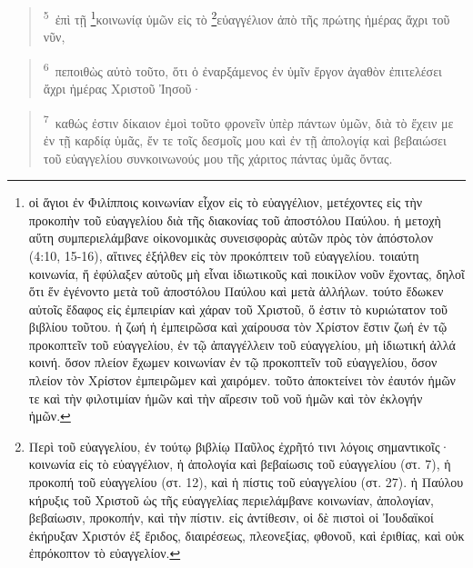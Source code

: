 \documentclass{article}
\newcommand{\currentverse}{1} %
\newcommand{\setcurrentverse}[1]{\renewcommand{\currentverse}{#1}}
\begin{document}
\begin{verse}

\setcurrentverse{5}

\setcounter{footnote}{0}

\textsuperscript{5}~ἐπὶ τῇ \footnote{
    οἱ ἅγιοι ἐν Φιλίπποις κοινωνίαν εἶχον εἰς τὸ εὐαγγέλιον, μετέχοντες εἰς τὴν προκοπὴν τοῦ εὐαγγελίου διὰ τῆς διακονίας τοῦ ἀποστόλου Παύλου. ἡ μετοχὴ αὕτη συμπεριελάμβανε οἰκονομικὰς συνεισφορὰς αὐτῶν πρὸς τὸν ἀπόστολον (4:10, 15-16), αἵτινες ἐξήλθεν εἰς τὸν προκόπτειν τοῦ εὐαγγελίου. τοιαύτη κοινωνία, ἥ ἐφύλαξεν αὐτοῦς μὴ εἶναι ἰδιωτικοῦς καὶ ποικίλον νοῦν ἔχοντας, δηλοῖ ὅτι ἕν ἐγένοντο μετὰ τοῦ ἀποστόλου Παύλου καὶ μετὰ ἀλλήλων. τούτο ἔδωκεν αὐτοῖς ἔδαφος εἰς ἐμπειρίαν καὶ χάραν τοῦ Χριστοῦ, ὅ ἐστιν τὸ κυριώτατον τοῦ βιβλίου τοῦτου. ἡ ζωή ἡ ἐμπειρῶσα καὶ χαίρουσα τὸν Χρίστον ἔστιν ζωή ἐν τῷ προκοπτεῖν τοῦ εὐαγγελίου, ἐν τῷ ἀπαγγέλλειν τοῦ εὐαγγελίου, μὴ ἰδιωτική ἀλλά κοινή. ὅσον πλείον ἔχωμεν κοινωνίαν ἐν τῷ προκοπτεῖν τοῦ εὐαγγελίου, ὅσον πλείον τὸν Χρίστον ἐμπειρῶμεν καὶ χαιρόμεν. τοῦτο ἀποκτείνει τὸν ἐαυτόν ἡμῶν τε καὶ τὴν φιλοτιμίαν ἡμῶν καὶ τὴν αἵρεσιν τοῦ νοῦ ἡμῶν καὶ τὸν ἐκλογήν ἡμῶν.
    }κοινωνίᾳ ὑμῶν εἰς τὸ \footnote{
Περὶ τοῦ εὐαγγελίου, ἐν τούτῳ βιβλίῳ Παῦλος ἐχρῆτό τινι λόγοις σημαντικοῖς· κοινωνία εἰς τὸ εὐαγγέλιον, ἡ ἀπολογία καὶ βεβαίωσις τοῦ εὐαγγελίου (στ. 7), ἡ προκοπή τοῦ εὐαγγελίου (στ. 12), καὶ ἡ πίστις τοῦ εὐαγγελίου (στ. 27). ἠ Παύλου κήρυξις τοῦ Χριστοῦ ὡς τῆς εὐαγγελίας περιελάμβανε κοινωνίαν, ἀπολογίαν, βεβαίωσιν, προκοπήν, καὶ τὴν πίστιν. εἰς ἀντίθεσιν, οἱ δὲ πιστοὶ οἱ Ἰουδαϊκοί ἐκήρυξαν Χριστόν ἐξ ἔριδος, διαιρέσεως, πλεονεξίας, φθονοῦ, καὶ ἐριθίας, καὶ οὐκ ἐπρόκοπτον τὸ εὐαγγελίον.
    }εὐαγγέλιον ἀπὸ τῆς πρώτης ἡμέρας ἄχρι τοῦ νῦν,

\end{verse}

\begin{verse}

\setcurrentverse{6}

\setcounter{footnote}{0}

\textsuperscript{6}~πεποιθὼς αὐτὸ τοῦτο, ὅτι ὁ ἐναρξάμενος ἐν ὑμῖν ἔργον ἀγαθὸν ἐπιτελέσει ἄχρι ἡμέρας Χριστοῦ Ἰησοῦ·

\end{verse}

\begin{verse}

\setcurrentverse{7}

\setcounter{footnote}{0}

\textsuperscript{7}~καθώς ἐστιν δίκαιον ἐμοὶ τοῦτο φρονεῖν ὑπὲρ πάντων ὑμῶν, διὰ τὸ ἔχειν με ἐν τῇ καρδίᾳ ὑμᾶς, ἔν τε τοῖς δεσμοῖς μου καὶ ἐν τῇ ἀπολογίᾳ καὶ βεβαιώσει τοῦ εὐαγγελίου συνκοινωνούς μου τῆς χάριτος πάντας ὑμᾶς ὄντας.

\end{verse}
\end{document}
